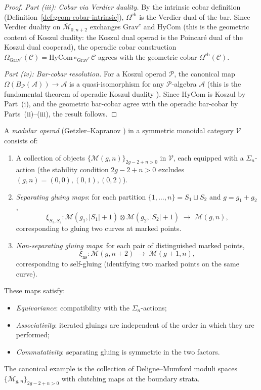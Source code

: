 \begin{proof}
\emph{Part (iii): Cobar via Verdier duality.}
By the intrinsic cobar definition
(Definition~\ref{def:geom-cobar-intrinsic}), $\Omega^{\mathrm{ch}}$
is the Verdier dual of the bar.  Since Verdier duality on
$\overline{\mathcal{M}}_{0,n+2}$ exchanges $\mathrm{Grav}^c$ and
$\mathrm{HyCom}$ (this is the geometric content of Koszul duality:
the Koszul dual operad is the Poincaré dual of the Koszul dual
cooperad), the operadic cobar construction
$\Omega_{\mathrm{Grav}^c}(\mathcal{C}) = \mathrm{HyCom}
\circ_{\mathrm{Grav}^c} \mathcal{C}$ agrees with the
geometric cobar $\Omega^{\mathrm{ch}}(\mathcal{C})$.

\emph{Part (iv): Bar-cobar resolution.}
For a Koszul operad $\mathcal{P}$, the canonical map
$\Omega(B_{\mathcal{P}}(\mathcal{A})) \to \mathcal{A}$ is a
quasi-isomorphism for any $\mathcal{P}$-algebra $\mathcal{A}$ (this
is the fundamental theorem of operadic Koszul duality
\cite[Theorem~11.3.3]{LV12}).  Since $\mathrm{HyCom}$ is Koszul
by Part~(i), and the geometric bar-cobar agree with the operadic
bar-cobar by Parts~(ii)--(iii), the result follows.
\end{proof}

\begin{definition}\label{def:modular-operad}
A \emph{modular operad} (Getzler--Kapranov \cite[\S5]{GeK98})
in a symmetric monoidal category $\mathcal{V}$ consists of:
\begin{enumerate}[label=(\roman*)]
\item A collection of objects
   $\{\mathcal{M}(g,n)\}_{2g-2+n>0}$ in $\mathcal{V}$,
   each equipped with a $\Sigma_n$-action (the stability condition
   $2g-2+n > 0$ excludes $(g,n) = (0,0), (0,1), (0,2)$).
\item \emph{Separating gluing maps}: for each partition
   $\{1, \ldots, n\} = S_1 \sqcup S_2$ and $g = g_1 + g_2$,
   \[
   \xi_{S_1, S_2}\colon \mathcal{M}(g_1, |S_1|+1)
   \otimes \mathcal{M}(g_2, |S_2|+1)
   \;\longrightarrow\; \mathcal{M}(g, n),
   \]
   corresponding to gluing two curves at marked points.
\item \emph{Non-separating gluing maps}: for each pair of
   distinguished marked points,
   \[
   \xi_{\mathrm{ns}}\colon \mathcal{M}(g, n+2)
   \;\longrightarrow\; \mathcal{M}(g+1, n),
   \]
   corresponding to self-gluing (identifying two marked points
   on the same curve).
\end{enumerate}
These maps satisfy:
\begin{itemize}
\item \emph{Equivariance}: compatibility with the $\Sigma_n$-actions;
\item \emph{Associativity}: iterated gluings are independent of
   the order in which they are performed;
\item \emph{Commutativity}: separating gluing is symmetric in
   the two factors.
\end{itemize}
The canonical example is the collection of Deligne--Mumford moduli
spaces $\{\overline{\mathcal{M}}_{g,n}\}_{2g-2+n>0}$ with clutching
maps at the boundary strata.
\end{definition}


